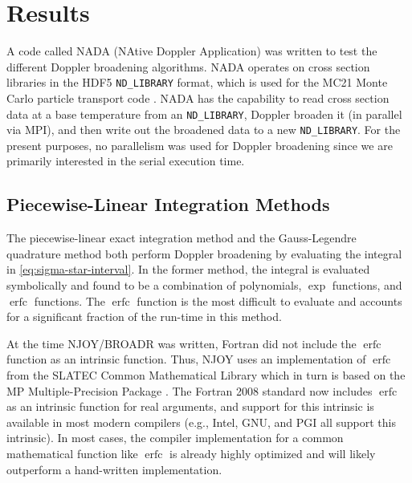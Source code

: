 \documentclass[3p,authoryear]{elsarticle}
\DeclareMathOperator\erfc{erfc}
\begin{document}
\section{Results}

A code called NADA (NAtive Doppler Application) was written to test the
different Doppler broadening algorithms. NADA operates on cross section
libraries in the HDF5 \texttt{ND\_LIBRARY} format, which is used for the MC21
Monte Carlo particle transport code \citep{snamc-griesheimer-2013}. NADA has the
capability to read cross section data at a base temperature from an
\texttt{ND\_LIBRARY}, Doppler broaden it (in parallel via MPI), and then write
out the broadened data to a new \texttt{ND\_LIBRARY}. For the present purposes,
no parallelism was used for Doppler broadening since we are primarily interested
in the serial execution time.

\subsection{Piecewise-Linear Integration Methods}

The piecewise-linear exact integration method and the Gauss-Legendre quadrature
method both perform Doppler broadening by evaluating the integral in
\autoref{eq:sigma-star-interval}. In the former method, the integral is
evaluated symbolically and found to be a combination of polynomials, $\exp$
functions, and $\erfc$ functions. The $\erfc$ function is the most difficult to
evaluate and accounts for a significant fraction of the run-time in this method.

At the time NJOY/BROADR was written, Fortran did not include the $\erfc$
function as an intrinsic function. Thus, NJOY uses an implementation of $\erfc$
from the SLATEC Common Mathematical Library which in turn is based on the MP
Multiple-Precision Package \citep{acm-brent-1978}. The Fortran 2008 standard now
includes $\erfc$ as an intrinsic function for real arguments, and support for
this intrinsic is available in most modern compilers (e.g., Intel, GNU, and PGI
all support this intrinsic). In most cases, the compiler implementation for a
common mathematical function like $\erfc$ is already highly optimized and will
likely outperform a hand-written implementation.
\end{document}

